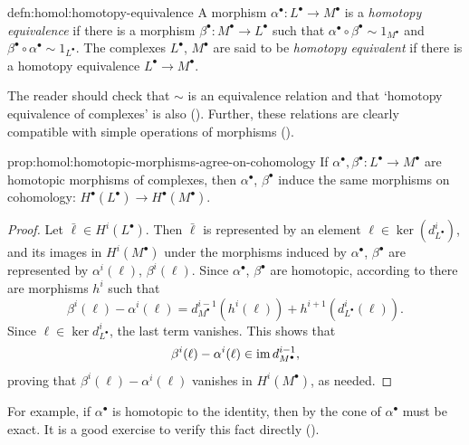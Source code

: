 \begin{defn}{}{defn:homol:homotopy-equivalence}
  A morphism $\alpha^\bullet : L^\bullet \to M^\bullet$ is a
  \emph{homotopy equivalence} if there is a morphism
  $\beta^\bullet : M^\bullet \to L^\bullet$ such that
  $\alpha^\bullet \circ \beta^\bullet \sim 1_{M^\bullet}$ and
  $\beta^\bullet \circ \alpha^\bullet \sim 1_{L^\bullet}$. The
  complexes $L^\bullet$, $M^\bullet$ are said to be \emph{homotopy
    equivalent} if there is a homotopy equivalence
  $L^\bullet \to M^\bullet$.
\end{defn}

The reader should check that $\sim$ is an equivalence relation and
that `homotopy equivalence of complexes' is also
().
Further, these relations are clearly compatible with simple operations
of morphisms
().

\begin{prop}{}{prop:homol:homotopic-morphisms-agree-on-cohomology}
  If $\alpha^\bullet, \beta^\bullet : L^\bullet \to M^\bullet$ are
  homotopic morphisms of complexes, then $\alpha^\bullet$,
  $\beta^\bullet$ induce the same morphisms on cohomology:
  $H^\bullet(L^\bullet) \to H^\bullet(M^\bullet)$.
\end{prop}

\begin{proof}
  Let $\bar\ell \in H^i(L^\bullet)$. Then $\bar\ell$ is represented by
  an element $\ell \in \ker(d^i_{L^\bullet})$, and its images in
  $H^i(M^\bullet)$ under the morphisms induced by $\alpha^\bullet$,
  $\beta^\bullet$ are represented by $\alpha^i(\ell)$,
  $\beta^i(\ell)$. Since $\alpha^\bullet$, $\beta^\bullet$ are
  homotopic, according to  there are morphisms $h^i$
  such that
  \[
    \beta^i(\ell) - \alpha^i(\ell) = d^{i-1}_{M^\bullet}(h^i(\ell)) +
    h^{i+1}(d^i_{L^\bullet}(\ell)).
  \]
  Since $\ell \in \ker d^i_{L^\bullet}$, the last term vanishes. This
  shows that
  \[
    \beta^i(\ell) - \alpha^i(\ell) \in \operatorname{im} d^{i-1}_{M^\bullet},
  \]
  proving that $\beta^i(\ell) - \alpha^i(\ell)$ vanishes in
  $H^i(M^\bullet)$, as needed.
\end{proof}

For example, if $\alpha^\bullet$ is homotopic to the identity, then by
 the cone of $\alpha^\bullet$ must be exact. It is a
good exercise to verify this fact directly
().

